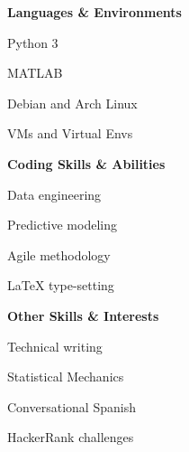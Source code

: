 \documentclass[letterpaper,final]{memoir}
\newcommand{\LargeSep}{\vspace{1.3em}}
\newcommand{\Sep}{\vspace{1.0em}}
\newcommand{\SmallSep}{\vspace{0.4em}}
\newcommand{\CVItem}[1]
	{\textbf{\color{Blue} #1}}
\begin{document}
\Sep
\CVItem{Languages \& Environments}
\SmallSep

\begin{multicols}{4}

    \begin{compactitem}[\color{Blue}$\circ$]
		
		\item Python 3
        \SmallSep
        
        \item MATLAB
		\SmallSep
        
        \item Debian and Arch Linux
        \SmallSep

        \item VMs and Virtual Envs
    
	\end{compactitem}

\end{multicols}

\Sep
\CVItem{Coding Skills \& Abilities}
\SmallSep

\begin{multicols}{4}

    \begin{compactitem}[\color{Blue}$\circ$]

        \item Data engineering
        \SmallSep

        \item Predictive modeling
        \SmallSep
   
        \item Agile methodology
        \SmallSep

        \item LaTeX type-setting
        
	\end{compactitem}

\end{multicols}

\Sep
\CVItem{Other Skills \& Interests}
\SmallSep

\begin{multicols}{4}

    \begin{compactitem}[\color{Blue}$\circ$] 

        \item Technical writing
        \SmallSep

        \item Statistical Mechanics
        \SmallSep
    
        \item Conversational Spanish
        \SmallSep 

		\item HackerRank challenges    
	\end{compactitem}
\end{multicols}
\LargeSep
\end{document}
